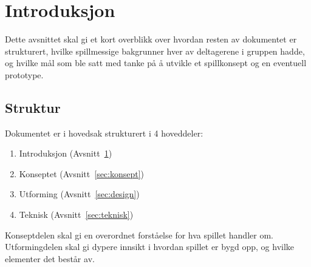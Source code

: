 \section{Introduksjon}\label{sec:intro}
Dette avsnittet skal gi et kort overblikk over hvordan resten av
dokumentet er strukturert, hvilke spillmessige bakgrunner hver av
deltagerene i gruppen hadde, og hvilke mål som ble satt med tanke på å
utvikle et spillkonsept og en eventuell prototype.
\subsection{Struktur}
Dokumentet er i hovedsak strukturert i 4 hoveddeler:
\begin{enumerate}
	\item Introduksjon (Avsnitt~\ref{sec:intro})
	\item Konseptet (Avsnitt~\ref{sec:konsept})
	\item Utforming (Avsnitt~\ref{sec:design})
	\item Teknisk (Avsnitt~\ref{sec:teknisk})
\end{enumerate}
Konseptdelen skal gi en overordnet forståelse for hva spillet handler
om. Utformingdelen skal gi dypere innsikt i hvordan spillet er bygd opp,
og hvilke elementer det består av.
